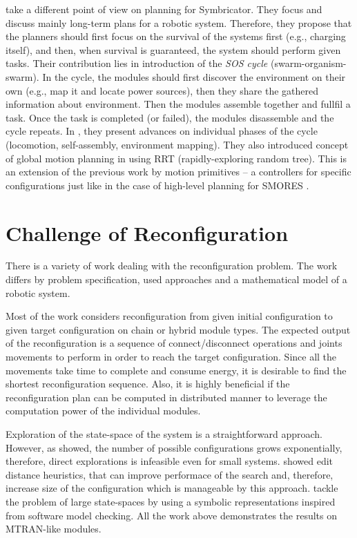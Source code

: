 \textcite{DBLP:conf/syscon/LeviMRKVSLC14} take a different point of view on
planning for Symbricator. They focus and discuss mainly long-term plans for a
robotic system. Therefore, they propose that the planners should first focus on
the survival of the systems first (e.g., charging itself), and then, when
survival is guaranteed, the system should perform given tasks. Their
contribution lies in introduction of the \emph{SOS cycle}
(swarm-organism-swarm). In the cycle, the modules should first discover the
environment on their own (e.g., map it and locate power sources), then they
share the gathered information about environment. Then the modules assemble
together and fullfil a task. Once the task is completed (or failed), the modules
disassemble and the cycle repeats. In \cite{DBLP:conf/syscon/LeviMRKVSLC14},
they present advances on individual phases of the cycle (locomotion,
self-assembly, environment mapping). They also introduced concept of global
motion planning in \cite{DBLP:conf/icra/VonasekSKP13} using RRT
(rapidly-exploring random tree). This is an extension of the previous work
\cite{DBLP:conf/taros/VonasekKP12} by motion primitives -- a controllers for
specific configurations just like in the case of high-level planning for SMORES
\cite{DBLP:journals/arobots/JingTYK18}.

\section{Challenge of Reconfiguration}

There is a variety of work dealing with the reconfiguration problem. The work
differs by problem specification, used approaches and a mathematical model of a
robotic system.

Most of the work considers reconfiguration from given initial configuration to
given target configuration on chain or hybrid module types. The expected output
of the reconfiguration is a sequence of connect/disconnect operations and joints
movements to perform in order to reach the target configuration. Since all the
movements take time to complete and consume energy, it is desirable to find the
shortest reconfiguration sequence. Also, it is highly beneficial if the
reconfiguration plan can be computed in distributed manner to leverage the
computation power of the individual modules.

Exploration of the state-space of the system is a straightforward approach.
However, as \textcite{DBLP:journals/jfr/ChirikjianPE96} showed, the number of
possible configurations grows exponentially, therefore, direct explorations is
infeasible even for small systems. \textcite{DBLP:conf/iros/AsadpourASI09}
showed edit distance heuristics, that can improve performace of the search and,
therefore, increase size of the configuration which is manageable by this
approach. \textcite{DBLP:conf/monterey/BaarirHKR10} tackle the problem of large
state-spaces by using a symbolic representations inspired from software model
checking. All the work above demonstrates the results on MTRAN-like modules.

